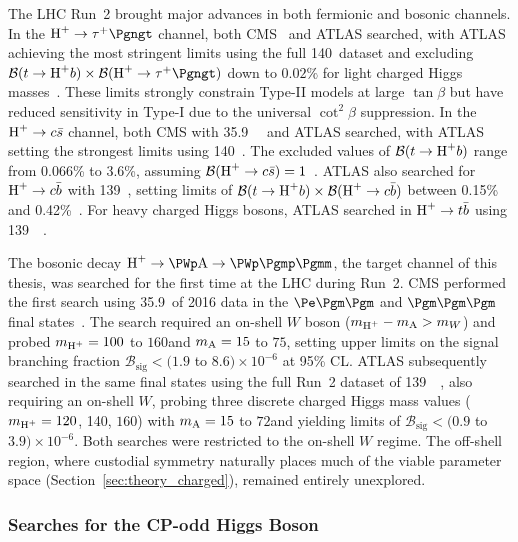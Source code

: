 The LHC Run~2 brought major advances in both fermionic and bosonic channels. In the $\PHp \to \PGtp\Pgngt$ channel, both CMS~\cite{CMS:2019bfg} and ATLAS searched, with ATLAS achieving the most stringent limits using the full 140~\fbinv dataset and excluding $\mathcal{B}(t \to \PHp b) \times \mathcal{B}(\PHp \to \PGtp\Pgngt)$ down to $0.02\%$ for light charged Higgs masses~\cite{ATLAS:2024tnv}. These limits strongly constrain Type-II models at large $\tan\beta$ but have reduced sensitivity in Type-I due to the universal $\cot^2\beta$ suppression. In the $\text{H}^+ \to c\bar{s}$ channel, both CMS with 35.9~\fbinv~\cite{CMS:2020osd} and ATLAS searched, with ATLAS setting the strongest limits using 140~\fbinv. The excluded values of $\mathcal{B}(t \to \text{H}^+ b)$ range from 0.066\% to 3.6\%, assuming $\mathcal{B}(\text{H}^+ \to c\bar{s}) = 1$~\cite{ATLAS:2024oqu}. ATLAS also searched for $\text{H}^+ \to c\bar{b}$ with 139~\fbinv, setting limits of $\mathcal{B}(t \to \text{H}^+ b) \times \mathcal{B}(\text{H}^+ \to c\bar{b})$ between 0.15\% and 0.42\%~\cite{ATLAS:2023bzb}. For heavy charged Higgs bosons, ATLAS searched in $\text{H}^+ \to t\bar{b}$ using 139~\fbinv~\cite{ATLAS:2021upq}.

The bosonic decay $\PHp \to \PWp \PA \to \PWp \Pgmp\Pgmm$, the target channel of this thesis, was searched for the first time at the LHC during Run~2. CMS performed the first search using 35.9~\fbinv of 2016 data in the $\Pe\Pgm\Pgm$ and $\Pgm\Pgm\Pgm$ final states~\cite{CMS:2019gfz}. The search required an on-shell $W$ boson ($m_{\text{H}^+} - m_{\text{A}} > m_W$) and probed $m_{\text{H}^+} = 100$ to $160$\GeV and $m_{\text{A}} = 15$ to $75$\GeV, setting upper limits on the signal branching fraction $\mathcal{B}_{\text{sig}} < (1.9$ to $8.6) \times 10^{-6}$ at 95\% CL. ATLAS subsequently searched in the same final states using the full Run~2 dataset of 139~\fbinv~\cite{ATLAS:2023ght}, also requiring an on-shell $W$, probing three discrete charged Higgs mass values ($m_{\text{H}^+} = 120$, 140, $160$\GeV) with $m_{\text{A}} = 15$ to $72$\GeV and yielding limits of $\mathcal{B}_{\text{sig}} < (0.9$ to $3.9) \times 10^{-6}$. Both searches were restricted to the on-shell $W$ regime. The off-shell region, where custodial symmetry naturally places much of the viable parameter space (Section~\ref{sec:theory_charged}), remained entirely unexplored.

\subsubsection{Searches for the CP-odd Higgs Boson}

